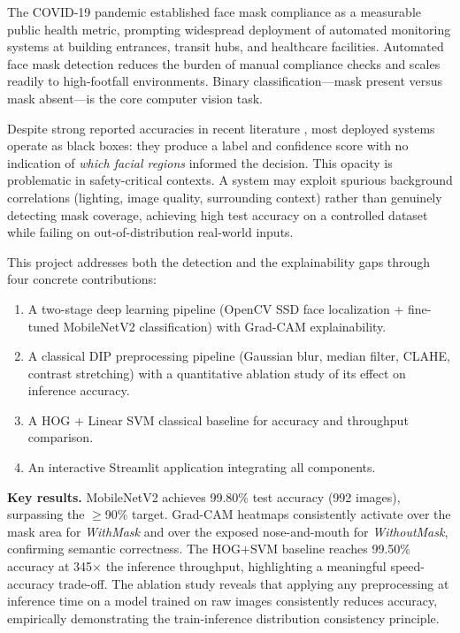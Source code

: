 \documentclass[11pt,a4paper]{article}
\begin{document}
The COVID-19 pandemic established face mask compliance as a measurable public
health metric, prompting widespread deployment of automated monitoring systems at
building entrances, transit hubs, and healthcare facilities.
Automated face mask detection reduces the burden of manual compliance checks and
scales readily to high-footfall environments.
Binary classification---mask present versus mask absent---is the core computer vision
task.

Despite strong reported accuracies in recent literature \cite{nagrath2021}, most
deployed systems operate as black boxes: they produce a label and confidence score
with no indication of \textit{which facial regions} informed the decision.
This opacity is problematic in safety-critical contexts.
A system may exploit spurious background correlations (lighting, image quality,
surrounding context) rather than genuinely detecting mask coverage, achieving
high test accuracy on a controlled dataset while failing on out-of-distribution
real-world inputs.

This project addresses both the detection and the explainability gaps through four
concrete contributions:
\begin{enumerate}[nosep, leftmargin=1.5em]
    \item A two-stage deep learning pipeline (OpenCV SSD face localization +
          fine-tuned MobileNetV2 classification) with Grad-CAM explainability.
    \item A classical DIP preprocessing pipeline (Gaussian blur, median filter,
          CLAHE, contrast stretching) with a quantitative ablation study of its
          effect on inference accuracy.
    \item A HOG + Linear SVM classical baseline for accuracy and throughput
          comparison.
    \item An interactive Streamlit application integrating all components.
\end{enumerate}

\textbf{Key results.}
MobileNetV2 achieves 99.80\% test accuracy (992 images),
surpassing the $\geq$90\% target.
Grad-CAM heatmaps consistently activate over the mask area for \textit{WithMask}
and over the exposed nose-and-mouth for \textit{WithoutMask}, confirming semantic
correctness.
The HOG+SVM baseline reaches 99.50\% accuracy at 345$\times$ the inference
throughput, highlighting a meaningful speed-accuracy trade-off.
The ablation study reveals that applying any preprocessing at inference time on a
model trained on raw images consistently reduces accuracy, empirically demonstrating
the train-inference distribution consistency principle.
\end{document}
